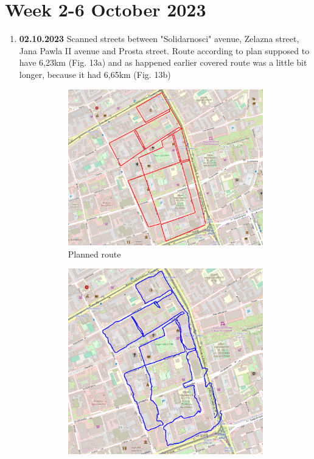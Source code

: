 \documentclass[a4paper,12pt]{article}
\begin{document}
\section{Week 2-6 October 2023}
\begin{enumerate}
	\item \textbf{02.10.2023} Scanned streets between "Solidarnosci" avenue, Zelazna street, Jana Pawla II avenue and Prosta street. Route according to plan supposed to have 6,23km (Fig. 13a) and as happened earlier covered route was a little bit longer, because it had 6,65km (Fig. 13b)
	\begin{figure}[H]
		\centering
		\begin{subfigure}{.77\textwidth}
			\centering
			\includegraphics[width=1\linewidth]{route_p12}
			\caption{Planned route}
			\label{fig:a12}
		\end{subfigure}%
		\linebreak
		\begin{subfigure}{.77\textwidth}
			\centering
			\includegraphics[width=1\linewidth]{route_c12}

\end{subfigure}
\end{figure}
\end{enumerate}
\end{document}
